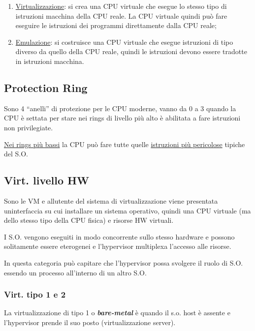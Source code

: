 \begin{enumerate}
\def\labelenumi{\arabic{enumi}.}
\item
  \ul{Virtualizzazione}: si crea una CPU virtuale che esegue lo stesso
  tipo di istruzioni macchina della CPU reale. La CPU virtuale quindi
  può fare eseguire le istruzioni dei programmi direttamente dalla CPU
  reale;
\item
  \ul{Emulazione}: si costruisce una CPU virtuale che esegue istruzioni
  di tipo diverso da quello della CPU reale, quindi le istruzioni devono
  essere tradotte in istruzioni macchina.
\end{enumerate}

\subsection{Protection Ring}\label{protection-ring}

Sono 4 ``anelli'' di protezione per le CPU moderne, vanno da 0 a 3
quando la CPU è settata per stare nei rings di livello più alto è
abilitata a fare istruzioni non privilegiate.

\ul{Nei rings più bassi} la CPU può fare tutte quelle \ul{istruzioni più
pericolose} tipiche del S.O.

\subsection{Virt. livello HW}\label{virt.-livello-hw}

Sono le VM e all\textquotesingle utente del sistema di virtualizzazione
viene presentata un\textquotesingle interfaccia su cui installare un
sistema operativo, quindi una CPU virtuale (ma dello stesso tipo della
CPU fisica) e risorse HW virtuali.

I S.O. vengono eseguiti in modo concorrente sullo stesso hardware e
possono solitamente essere eterogenei e l'hypervisor multiplexa
l'accesso alle risorse.

In questa categoria può capitare che l'hypervisor possa svolgere il
ruolo di S.O. essendo un processo all'interno di un altro S.O.

\subsubsection{Virt. tipo 1 e 2}\label{virt.-tipo-1-e-2}

La virtualizzazione di tipo 1 o \emph{\textbf{bare-metal}} è quando il
s.o. host è assente e l'hypervisor prende il suo posto (virtualizzazione
server).

